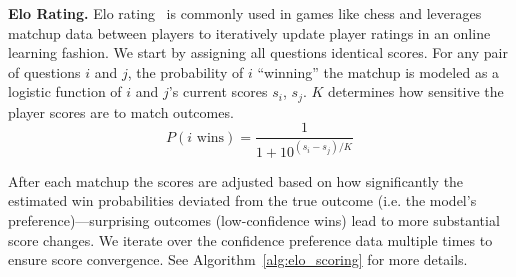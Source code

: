 \noindent\textbf{Elo Rating.}
Elo rating~\citep{elo_ratings} is commonly used in games like chess and leverages matchup data between players to iteratively update player ratings in an online learning fashion. We start by assigning all questions identical scores. For any pair of questions $i$ and $j$, the probability of $i$ ``winning'' the matchup is modeled as a logistic function of $i$ and $j$'s current scores $s_i$, $s_j$. $K$ determines how sensitive the player scores are to match outcomes. 
\begin{equation}
    P(i \text{ wins}) = \frac{1}{1 + 10^{(s_i-s_j)/K}}
\end{equation}


After each matchup the scores are adjusted based on how significantly the estimated win probabilities deviated from the true outcome (i.e. the model’s preference)---surprising outcomes (low-confidence wins) lead to more substantial score changes. We iterate over the confidence preference data multiple times to ensure score convergence. See Algorithm~\ref{alg:elo_scoring} for more details.

